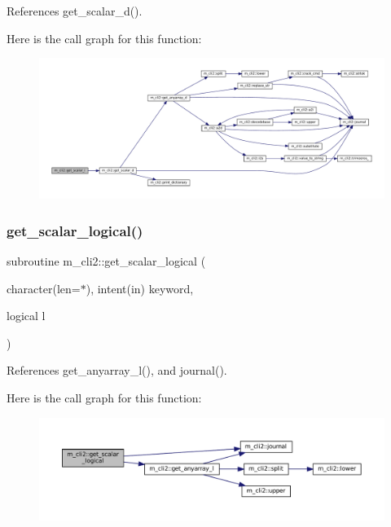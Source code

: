 References get\+\_\+scalar\+\_\+d().

Here is the call graph for this function\+:\nopagebreak
\begin{figure}[H]
\begin{center}
\leavevmode
\includegraphics[width=350pt]{namespacem__cli2_a9c5208ef6763da7e68dd1e118bea0b7a_cgraph}
\end{center}
\end{figure}
\mbox{\label{namespacem__cli2_a138d07d14246ee532ce36e67719e8c7d}} 
\subsubsection{\texorpdfstring{get\+\_\+scalar\+\_\+logical()}{get\_scalar\_logical()}}
{\footnotesize\ttfamily subroutine m\+\_\+cli2\+::get\+\_\+scalar\+\_\+logical (\begin{DoxyParamCaption}\item[{character(len=$\ast$), intent(in)}]{keyword,  }\item[{logical}]{l }\end{DoxyParamCaption})\hspace{0.3cm}{\ttfamily [private]}}



References get\+\_\+anyarray\+\_\+l(), and journal().

Here is the call graph for this function\+:\nopagebreak
\begin{figure}[H]
\begin{center}
\leavevmode
\includegraphics[width=350pt]{namespacem__cli2_a138d07d14246ee532ce36e67719e8c7d_cgraph}
\end{center}
\end{figure}
\mbox{\label{namespacem__cli2_ad089d91c66626de91bcda84523e80b54}} 

